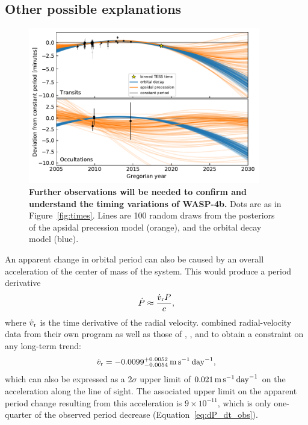 \documentclass[12pt,twocolumn,tighten]{aastex62}
\begin{document}
\subsection{Other possible explanations}


\begin{figure}[t]
	\begin{center}
		\leavevmode
		\includegraphics[width=0.9\textwidth]{f6.pdf}
	\end{center}
	\vspace{-0.7cm}
	\caption{
		{\bf Further observations will be needed to confirm and understand
			the timing variations of WASP-4b.} Dots are as in
		Figure~\ref{fig:times}.  Lines are 100 random draws from the
		posteriors of the apsidal precession model (orange), and the
		orbital decay model (blue).    
		\label{fig:future}
	}
\end{figure}

An apparent change in orbital period can also be caused by an overall
acceleration of the center of mass of the system.  This would produce
a period derivative
\begin{equation}
	\dot{P} \approx \frac{\dot{v}_{\rm r} P}{c},
\end{equation}
where $\dot{v}_{\rm r}$ is the time derivative of the radial velocity.
\citet{knutson_friends_2014} combined radial-velocity data from their
own program as well as those of \citet{wilson_wasp-4b_2008},
\citet{pont_determining_2011}, and \citet{husnoo_observational_2012}
to obtain a constraint on any long-term trend:
\begin{equation}
\dot{v}_{\rm r} =
   -0.0099^{+0.0052}_{-0.0054}
   \,{\rm m}\,{\rm s}^{-1}\,{\rm day}^{-1},
\end{equation}
which can also be expressed as a 2$\sigma$ upper limit of $0.021
\,{\rm m}\,{\rm s}^{-1}\,{\rm day}^{-1}$ on the acceleration along the
line of sight.  The associated upper limit on the apparent period
change resulting from this acceleration is $9\times 10^{-11}$, which
is only one-quarter of the observed period decrease
(Equation~\ref{eq:dP_dt_obs}).
\end{document}
